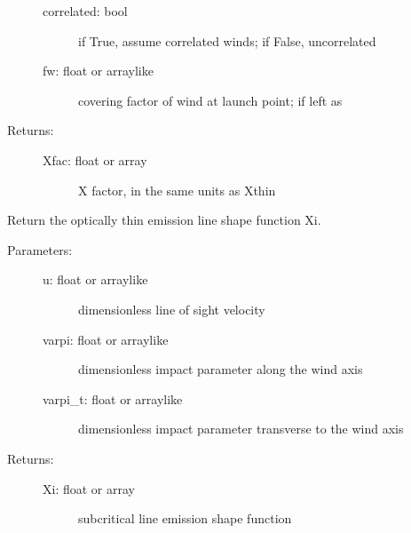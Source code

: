 \documentclass[letterpaper,10pt,english]{sphinxmanual}
\begin{document}
\begin{fulllineitems}
\begin{fulllineitems}
\begin{description}
\begin{description}
\item[{correlated: bool}] \leavevmode
if True, assume correlated winds; if False, uncorrelated

\item[{fw: float or arraylike}] \leavevmode
covering factor of wind at launch point; if left as

\end{description}

\item[{Returns:}] \leavevmode\begin{description}
\item[{Xfac: float or array}] \leavevmode
X factor, in the same units as Xthin

\end{description}

\end{description}

\end{fulllineitems}


\begin{fulllineitems}
\label{fulldoc:despotic.winds.pwind.Xi}
Return the optically thin emission line shape function
Xi.
\begin{description}
\item[{Parameters:}] \leavevmode\begin{description}
\item[{u: float or arraylike}] \leavevmode
dimensionless line of sight velocity

\item[{varpi: float or arraylike}] \leavevmode
dimensionless impact parameter along the wind axis

\item[{varpi\_t: float or arraylike}] \leavevmode
dimensionless impact parameter transverse to the wind axis

\end{description}

\item[{Returns:}] \leavevmode\begin{description}
\item[{Xi: float or array}] \leavevmode
subcritical line emission shape function

\end{description}

\end{description}


\end{fulllineitems}
\end{fulllineitems}
\end{document}
